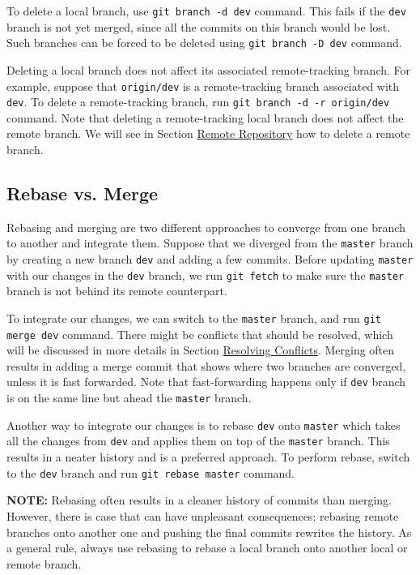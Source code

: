 \documentclass[11pt]{article}
\begin{document}
To delete a local branch, use \texttt{git branch -d dev} command. This fails if the \texttt{dev} branch is not yet merged, since all the commits on this branch would be lost. Such branches can be forced to be deleted using \texttt{git branch -D dev} command.

Deleting a local branch does not affect its associated remote-tracking branch. For example, suppose that \texttt{origin/dev} is a remote-tracking branch associated with \texttt{dev}. To delete a remote-tracking branch, run \texttt{git branch -d -r origin/dev} command. Note that deleting a remote-tracking local branch does not affect the remote branch. We will see in Section \hyperref[orgtarget7]{Remote Repository} how to delete a remote branch.

\subsection{\label{orgtarget6} Rebase vs. Merge}
\label{sec:orgheadline12}
Rebasing and merging are two different approaches to converge from one branch to another and integrate them. Suppose that we diverged from the \texttt{master} branch by creating a new branch \texttt{dev} and adding a few commits. Before updating \texttt{master} with our changes in the \texttt{dev} branch, we run \texttt{git fetch} to make sure the \texttt{master} branch is not behind its remote counterpart.

To integrate our changes, we can switch to the \texttt{master} branch, and run \texttt{git merge dev} command. There might be conflicts that should be resolved, which will be discussed in more details in Section \hyperref[orgtarget8]{Resolving Conflicts}. Merging often results in adding a merge commit that shows where two branches are converged, unless it is fast forwarded. Note that fast-forwarding happens only if \texttt{dev} branch is on the same line but ahead the \texttt{master} branch.

Another way to integrate our changes is to rebase \texttt{dev} onto \texttt{master} which takes all the changes from \texttt{dev} and applies them on top of the \texttt{master} branch. This results in a neater history and is a preferred approach. To perform rebase, switch to the \texttt{dev} branch and run \texttt{git rebase master} command.

\textbf{NOTE:} Rebasing often results in a cleaner history of commits than merging. However, there is case that can have unpleasant consequences: rebasing remote branches onto another one and pushing the final commits rewrites the history. As a general rule, always use rebasing to rebase a local branch onto another local or remote branch.
\end{document}
